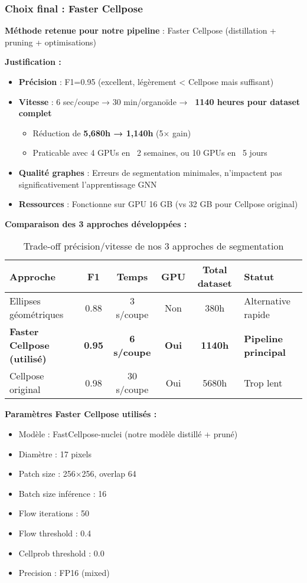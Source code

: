\subsubsection{Choix final : Faster Cellpose}

\textbf{Méthode retenue pour notre pipeline} : Faster Cellpose (distillation + pruning + optimisations)

\textbf{Justification :}
\begin{itemize}
    \item \textbf{Précision} : F1=0.95 (excellent, légèrement < Cellpose mais suffisant)
    \item \textbf{Vitesse} : 6 sec/coupe → 30 min/organoïde → \textbf{~1140 heures pour dataset complet}
        \begin{itemize}
            \item Réduction de \textbf{5,680h → 1,140h} (5× gain)
            \item Praticable avec 4 GPUs en ~2 semaines, ou 10 GPUs en ~5 jours
        \end{itemize}
    \item \textbf{Qualité graphes} : Erreurs de segmentation minimales, n'impactent pas significativement l'apprentissage GNN
    \item \textbf{Ressources} : Fonctionne sur GPU 16 GB (vs 32 GB pour Cellpose original)
\end{itemize}

\textbf{Comparaison des 3 approches développées :}
\begin{table}[h]
\centering
\caption{Trade-off précision/vitesse de nos 3 approches de segmentation}
\begin{tabular}{lccccl}
\toprule
\textbf{Approche} & \textbf{F1} & \textbf{Temps} & \textbf{GPU} & \textbf{Total dataset} & \textbf{Statut} \\
\midrule
Ellipses géométriques & 0.88 & 3 s/coupe & Non & 380h & Alternative rapide \\
\textbf{Faster Cellpose (utilisé)} & \textbf{0.95} & \textbf{6 s/coupe} & \textbf{Oui} & \textbf{1140h} & \textbf{Pipeline principal} \\
Cellpose original & 0.98 & 30 s/coupe & Oui & 5680h & Trop lent \\
\bottomrule
\end{tabular}
\end{table}

\textbf{Paramètres Faster Cellpose utilisés :}
\begin{itemize}
    \item Modèle : FastCellpose-nuclei (notre modèle distillé + pruné)
    \item Diamètre : 17 pixels
    \item Patch size : 256×256, overlap 64
    \item Batch size inférence : 16
    \item Flow iterations : 50
    \item Flow threshold : 0.4
    \item Cellprob threshold : 0.0
    \item Precision : FP16 (mixed)
\end{itemize}

